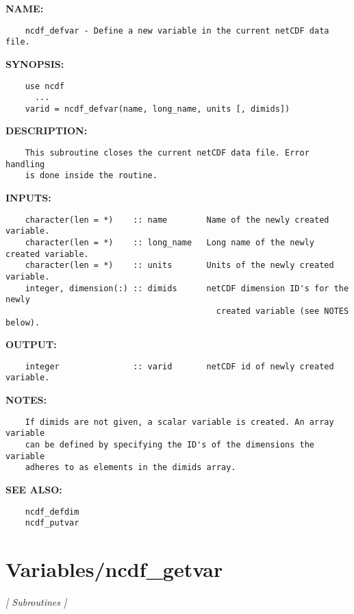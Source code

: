 \label{ch:robo113}
\label{ch:Variables_ncdf_defvar}
\textbf{NAME:}\hspace{0.08in}\begin{Verbatim}
    ncdf_defvar - Define a new variable in the current netCDF data file.
\end{Verbatim}
\textbf{SYNOPSIS:}\hspace{0.08in}\begin{Verbatim}
    use ncdf
      ...
    varid = ncdf_defvar(name, long_name, units [, dimids])
\end{Verbatim}
\textbf{DESCRIPTION:}\hspace{0.08in}\begin{Verbatim}
    This subroutine closes the current netCDF data file. Error handling
    is done inside the routine.
\end{Verbatim}
\textbf{INPUTS:}\hspace{0.08in}\begin{Verbatim}
    character(len = *)    :: name        Name of the newly created variable.
    character(len = *)    :: long_name   Long name of the newly created variable.
    character(len = *)    :: units       Units of the newly created variable.
    integer, dimension(:) :: dimids      netCDF dimension ID's for the newly
                                           created variable (see NOTES below).
\end{Verbatim}
\textbf{OUTPUT:}\hspace{0.08in}\begin{Verbatim}
    integer               :: varid       netCDF id of newly created variable.
\end{Verbatim}
\textbf{NOTES:}\hspace{0.08in}\begin{Verbatim}
    If dimids are not given, a scalar variable is created. An array variable
    can be defined by specifying the ID's of the dimensions the variable
    adheres to as elements in the dimids array.
\end{Verbatim}
\textbf{SEE ALSO:}\hspace{0.08in}\begin{Verbatim}
    ncdf_defdim
    ncdf_putvar
\end{Verbatim}
\section{Variables/ncdf\_getvar}
\textsl{[ Subroutines ]}

